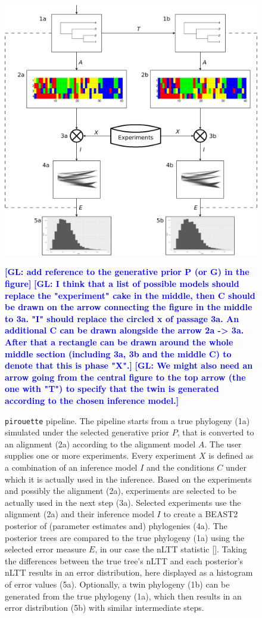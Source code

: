 \documentclass{article}
\newcommand{\giovanni}[1]{\textcolor{blue}{\textbf{[GL: #1]}}}
\begin{document}
\begin{figure}
  \centering
  \includegraphics[width=\textwidth]{workflow.png}
  \caption{
    \texttt{pirouette} pipeline. 
    The pipeline starts from a true phylogeny (1a) simulated under the selected generative prior $\mathit{P}$, that is converted to an alignment (2a) according to the alignment model $\mathit{A}$. The user supplies one or more experiments. Every experiment $\mathit{X}$ is defined as a combination of an inference model $\mathit{I}$ and the conditions $\mathit{C}$ under which it is actually used in the inference. Based on the experiments and possibly the alignment (2a), experiments are selected to be actually used in the next step (3a).
    Selected experiments use the alignment (2a) and their inference model $\mathit{I}$ to create a BEAST2 posterior of (parameter estimates and) phylogenies (4a). The posterior trees are compared to the true phylogeny (1a) using the selected error measure $\mathit{E}$, in our case the nLTT statistic [\cite{janzen2015approximate}]. Taking the differences between the true tree's nLTT and each posterior's nLTT results in an error distribution, here displayed as a histogram
    of error values (5a). Optionally, a twin phylogeny (1b) can be generated from the true phylogeny (1a), which then results in an error distribution (5b) with similar intermediate steps.
  }
  \label{fig:pipeline}
  \giovanni{add reference to the generative prior P (or G) in the figure}
  \giovanni{I think that a list of possible models should replace the "experiment" cake in the middle, then C should be drawn on the arrow connecting the figure in the middle to 3a. "I" should replace the circled x of passage 3a. An additional C can be drawn alongside the arrow 2a -> 3a. After that a rectangle can be drawn around the whole middle section (including 3a, 3b and the middle C) to denote that this is phase "X".}
  \giovanni{We might also need an arrow going from the central figure to the top arrow (the one with "T") to specify that the twin is generated according to the chosen inference model.}
\end{figure}
\end{document}
